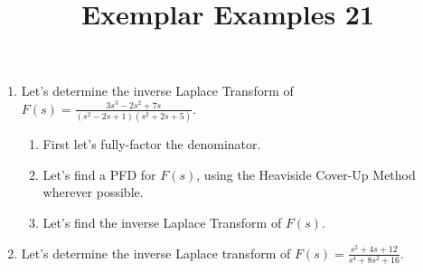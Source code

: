 \documentclass{ximera}
\begin{document}
\begin{abstract}
 \end{abstract}

    \title{Exemplar Examples 21}
    
    \maketitle


\begin{enumerate}

\item Let's determine the inverse Laplace Transform of $\displaystyle F(s)=\frac{3s^3-2s^2+7s}{(s^2-2s+1)(s^2+2s+5)}$.


\begin{enumerate}
\item First let's fully-factor the denominator.

\vfill



\item  Let's find a PFD for $F(s)$, using the Heaviside Cover-Up Method wherever possible.


\vfill
\vfill
\vfill


\newpage

\item  Let's  find the inverse Laplace Transform of $F(s)$.

\vfill



\end{enumerate}



\item Let's determine the inverse Laplace transform of $\displaystyle F(s)=\frac{s^2+4s+12}{s^4+8s^2+16}$.








\vfill


    
\end{enumerate}
\end{document}
